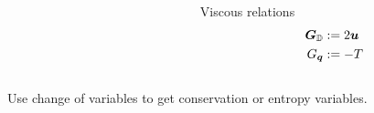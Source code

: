 \documentclass[18pt,xcolor=table]{beamer}
\begin{document}
\begin{frame}[t]
\begin{columns}[t]
\begin{column}{0.3\textwidth}
\end{column} 
\begin{column}{0.3\textwidth}
Viscous relations
\vspace{-2ex}
\begin{align*}
\boldsymbol G_{\mathbb{D}}&:=2\boldsymbol u\\
G_{\boldsymbol q}&:=-T\\
\end{align*}
\end{column} 
\end{columns}
\centering
Use change of variables to get conservation or entropy variables.
\end{frame}
\end{document}
